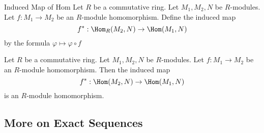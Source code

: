 \documentclass[a4paper]{article}
\begin{document}
\begin{defn}{Induced Map of Hom}{} Let $R$ be a commutative ring. Let $M_1,M_2,N$ be $R$-modules. Let $f:M_1\to M_2$ be an $R$-module homomorphism. Define the induced map $$f^\ast:\Hom_R(M_2,N)\to\Hom(M_1,N)$$ by the formula $\varphi\mapsto\varphi\circ f$
\end{defn}

\begin{lmm}{}{} Let $R$ be a commutative ring. Let $M_1,M_2,N$ be $R$-modules. Let $f:M_1\to M_2$ be an $R$-module homomorphism. Then the induced map $$f^\ast:\Hom(M_2,N)\to\Hom(M_1,N)$$ is an $R$-module homomorphism. 
\end{lmm}

\subsection{More on Exact Sequences}
\end{document}

